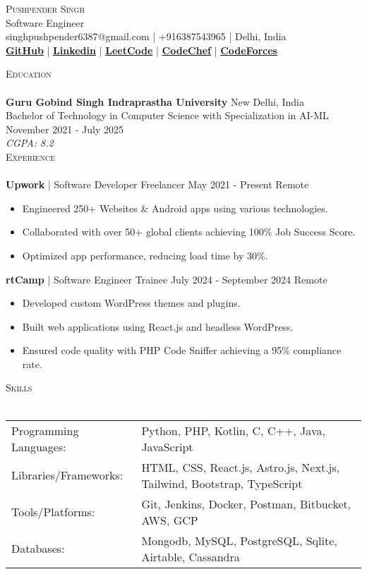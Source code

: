 \documentclass[a4paper]{article}
\newcommand{\header}[1]{
  {\hspace*{-18pt}\vspace*{6pt} \textsc{#1}}
  \vspace*{-6pt} \\ \hspace*{-18pt}\hrulefill \\}
\begin{document}
\vspace*{-40pt}

\begin{center}
{\Huge \scshape {Pushpender Singh}}\\
Software Engineer\\
singhpushpender6387@gmail.com | +916387543965 | Delhi, India\\
\textbf{\href{https://github.com/pushpenderindia}{GitHub}} | \textbf{\href{https://linkedin.com/in/pushpenderindia}{Linkedin}} | \textbf{\href{https://leetcode.com/u/pushu\_singh}{LeetCode}} | \textbf{\href{https://www.codechef.com/users/singhindia}{CodeChef}} | \textbf{\href{https://codeforces.com/profile/pushpenderindia}{CodeForces}}
\end{center}

\header{Education}
\textbf{Guru Gobind Singh Indraprastha University} \hfill New Delhi, India\\
Bachelor of Technology in Computer Science with Specialization in AI-ML \hfill November 2021 - July 2025\\
{\sl CGPA: 8.2}\\[2mm]
\header{Experience}\vspace{2mm}
\textbf{Upwork} | Software Developer Freelancer \hfill May 2021 - Present \hfill Remote\\
\vspace{-3mm}
\begin{itemize}
\item Engineered 250+ Websites \& Android apps using various technologies.
\item Collaborated with over 50+ global clients achieving 100\% Job Success Score.
\item Optimized app performance, reducing load time by 30\%.
\end{itemize}

\textbf{rtCamp} | Software Engineer Trainee \hfill July 2024 - September 2024 \hfill Remote\\
\vspace{-3mm}
\begin{itemize}
\item Developed custom WordPress themes and plugins.
\item Built web applications using React.js and headless WordPress.
\item Ensured code quality with PHP Code Sniffer achieving a 95\% compliance rate.
\end{itemize}

\header{Skills}
\vspace{2mm}\begin{longtable}{p{4cm}p{12cm}}
Programming Languages: & Python, PHP, Kotlin, C, C++, Java, JavaScript \\ 
Libraries/Frameworks: & HTML, CSS, React.js, Astro.js, Next.js, Tailwind, Bootstrap, TypeScript \\ 
Tools/Platforms: & Git, Jenkins, Docker, Postman, Bitbucket, AWS, GCP \\ 
Databases: & Mongodb, MySQL, PostgreSQL, Sqlite, Airtable, Cassandra
\end{longtable}\vspace{1mm}
\end{document}
